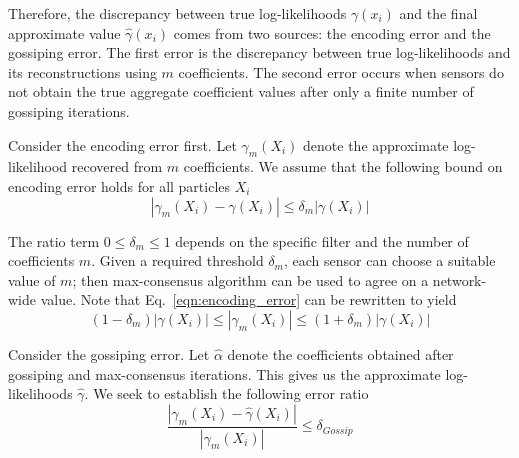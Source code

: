 \documentclass[10pt,letterpaper,final]{article}
\begin{document}
Therefore, the discrepancy between true log-likelihoods $\gamma(x_i)$ and the final approximate value $\hat{\gamma}(x_i)$ comes from two sources: the encoding error and the gossiping error. The first error is the discrepancy between true log-likelihoods and its reconstructions using $m$ coefficients. The second error occurs when sensors do not obtain the true aggregate coefficient values after only a finite number of gossiping iterations. 

Consider the encoding error first. Let $\gamma_m(X_i)$ denote the approximate log-likelihood recovered from $m$ coefficients. We assume that the following bound on encoding error holds for all particles $X_i$
\begin{equation}
|\gamma_{m}(X_i) - \gamma(X_i)|\leq \delta_m|\gamma(X_i)| 
\label{eqn:encoding_error}
\end{equation}




The ratio term $0\leq \delta_m\leq 1$ depends on the specific filter and the number of coefficients $m$. Given a required threshold $\delta_m$, each sensor can choose a suitable value of $m$; then max-consensus algorithm can be used to agree on a network-wide value. Note that Eq.~\eqref{eqn:encoding_error} can be rewritten to yield
\begin{equation}
(1-\delta_m)|\gamma(X_i)| \leq |\gamma_m(X_i)| \leq (1+\delta_m)|\gamma(X_i)|
\end{equation}

Consider the gossiping error. Let $\hat{\alpha}$ denote the coefficients obtained after gossiping and max-consensus iterations. This gives us the approximate log-likelihoods $\hat{\gamma}$. We seek to establish the following error ratio
\begin{equation}
\frac{|\gamma_m(X_i)-\hat{\gamma}(X_i)|}{|\gamma_m(X_i)|} \leq \delta_{Gossip}
\label{eqn:gossiping_error}
\end{equation}
\end{document}
